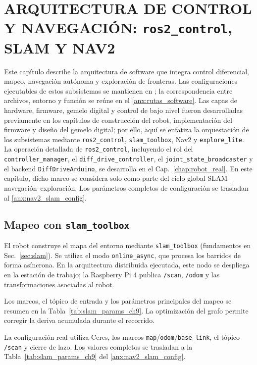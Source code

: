 \chapter{ARQUITECTURA DE CONTROL Y NAVEGACIÓN: \texttt{ros2\_control}, SLAM Y NAV2}
\label{chap:app_control_nav}

Este capítulo describe la arquitectura de software que integra control diferencial, mapeo, navegación autónoma y exploración de fronteras. Las configuraciones ejecutables de estos subsistemas se mantienen en ; la correspondencia entre archivos, entorno y función se reúne en el \ref{anx:rutas_software}. Las capas de hardware, firmware, gemelo digital y control de bajo nivel fueron desarrolladas previamente en los capítulos de construcción del robot, implementación del firmware y diseño del gemelo digital; por ello, aquí se enfatiza la orquestación de los subsistemas mediante \texttt{ros2\_control}, \texttt{slam\_toolbox}, Nav2 y \texttt{explore\_lite}. La operación detallada de \texttt{ros2\_control}, incluyendo el rol del \texttt{controller\_manager}, el \texttt{diff\_drive\_controller}, el \texttt{joint\_state\_broadcaster} y el backend \texttt{DiffDriveArduino}, se desarrolla en el Cap.~\ref{chap:robot_real}. En este capítulo, dicho marco se considera solo como parte del ciclo global SLAM--navegación--exploración. Los parámetros completos de configuración se trasladan al \ref{anx:nav2_slam_config}.

\section{Mapeo con \texttt{slam\_toolbox}}
\label{sec:slam_ch9}

El robot construye el mapa del entorno mediante \texttt{slam\_toolbox} (fundamentos en Sec.~\ref{sec:slam}). Se utiliza el modo \texttt{online\_async}, que procesa los barridos de forma asíncrona. En la arquitectura distribuida ejecutada, este nodo se despliega en la estación de trabajo; la Raspberry Pi 4 publica \texttt{/scan}, \texttt{/odom} y las transformaciones asociadas al robot.

Los marcos, el tópico de entrada y los parámetros principales del mapeo se resumen en la Tabla~\ref{tab:slam_params_ch9}. La optimización del grafo permite corregir la deriva acumulada durante el recorrido.

La configuración real utiliza Ceres, los marcos
\texttt{map}/\texttt{odom}/\texttt{base\_link}, el tópico \texttt{/scan} y
cierre de lazo. Los valores completos se trasladan a la
Tabla~\ref{tab:slam_params_ch9} del \ref{anx:nav2_slam_config}.

